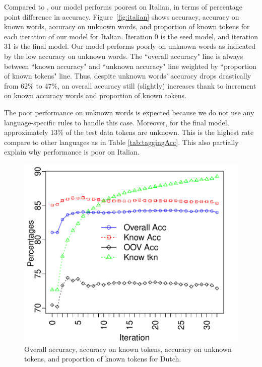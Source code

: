Compared to , our model performs poorest on
Italian, in terms of percentage point difference in accuracy.
Figure~\ref{fig:italian} shows accuracy,
accuracy on known words, accuracy on unknown words, and proportion of
known tokens for each iteration of our model for Italian. Iteration 0
is the seed model, and iteration 31 is the final model. Our model
performs poorly on unknown words as indicated by the low accuracy on
unknown words. The ``overall accuracy" line is always between ``known accuracy" and ``unknown accuracy" line weighted by ``proportion of known tokens" line. Thus, despite unknown words' accuracy drops drastically from 62\% to 47\%, an overall accuracy still (slightly) increases thank to increment on known accuracy words and proportion of known tokens. 

The poor performance on unknown words is expected because we do not use any language-specific rules to handle this case. Moreover, for the final model, approximately 13\% of the test data tokens are unknown.  This is the highest rate compare to other languages as in Table \ref{tab:taggingAcc}. This also partially explain why performance is poor on Italian. 

 \begin{figure}
 \centering
 \includegraphics[scale=0.7]{Figures/nlAcc}
 \caption{Overall accuracy, accuracy on known tokens, accuracy on
   unknown tokens, and proportion of known tokens for Dutch.}
 \label{fig:dutch}
 \end{figure}

